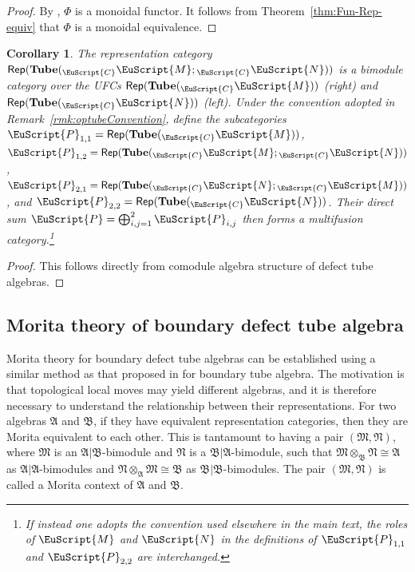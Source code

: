 \documentclass[a4paper,11pt]{article}
\newtheorem{corollary}[theorem]{Corollary}
\theoremstyle{definition}
\theoremstyle{remark}
\newcommand\eC           {\EuScript{C}}
\newcommand\eM          {\EuScript{M}}
\newcommand\eN         {\EuScript{N}}
\newcommand\eP         {\EuScript{P}}
\newcommand{\Rep}{\mathsf{Rep}}
\newcommand{\Tube}{\mathbf{Tube}}
\begin{document}
\begin{proof}
    By \cite[Theorem~23]{jia2025tube}, $\Phi$ is a monoidal functor. It follows from Theorem~\ref{thm:Fun-Rep-equiv} that $\Phi$ is a monoidal equivalence. 
\end{proof}

\begin{corollary}
The representation category $\Rep(\Tube({}_\eC\eM;{}_\eC\eN))$ is a bimodule category over the UFCs $\Rep(\Tube({}_\eC\eM))$ (right) and $\Rep(\Tube({}_\eC\eN))$ (left). Under the convention adopted in Remark~\ref{rmk:optubeConvention},  define the subcategories
$\eP_{1,1}=\Rep(\Tube({}_\eC\eM))$,
$\eP_{1,2}=\Rep(\Tube({}_\eC\eM;{}_\eC\eN))$,
$\eP_{2,1}=\Rep(\Tube({}_\eC\eN;{}_\eC\eM))$, and
$\eP_{2,2}=\Rep(\Tube({}_\eC\eN))$.
Their direct sum $\eP=\bigoplus_{i,j=1}^{2}\eP_{i,j}$ then forms a multifusion category.\footnote{If instead one adopts the convention used elsewhere in the main text, the roles of $\eM$ and $\eN$ in the definitions of $\eP_{1,1}$ and $\eP_{2,2}$ are interchanged.}
\end{corollary}
\begin{proof}
This follows directly from comodule algebra structure of defect tube algebras.
\end{proof}

\subsection{Morita theory of boundary defect tube algebra}

Morita theory  for boundary defect tube algebras can be established using a similar method as that proposed in \cite{Kitaev2012boundary,kong2012universal} for boundary tube algebra. The motivation is that topological local moves may yield different algebras, and it is therefore necessary to understand the relationship between their representations.
For two algebras $\mathfrak{A}$ and $\mathfrak{B}$, if they have equivalent representation categories, then they are Morita equivalent to each other. 
This is tantamount to having a pair $(\mathfrak{M},\mathfrak{N})$, where $\mathfrak{M}$ is an $\mathfrak{A}|\mathfrak{B}$-bimodule and $\mathfrak{N}$ is a $\mathfrak{B}|\mathfrak{A}$-bimodule, such that  $\mathfrak{M}\otimes_{\mathfrak{B}}\mathfrak{N}\cong \mathfrak{A}$ as $\mathfrak{A}|\mathfrak{A}$-bimodules and $\mathfrak{N}\otimes_{\mathfrak{A}}\mathfrak{M} \cong \mathfrak{B}$ as $\mathfrak{B}|\mathfrak{B}$-bimodules. The pair $(\mathfrak{M},\mathfrak{N})$ is called a Morita context of $\mathfrak{A}$ and $\mathfrak{B}$. 
\end{document}
